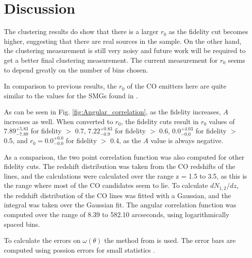 \section{Discussion}

The clustering results do show that there is a larger $r_0$ as the fidelity cut becomes higher, suggesting that there are real sources in the sample. On the other hand, the clustering measurement is still very noisy and future work will be required to get a better final clustering measurement. The current measurement for $r_0$ seems to depend greatly on the number of bins chosen. 

In comparison to previous results, the $r_0$ of the CO emitters here are quite similar to the values for the SMGs found in \cite{10.1111/j.1365-2966.2011.20303.x}.

As can be seen in Fig. \ref{fig:Angular_correlation}, as the fidelity increases, $A$ increases as well. When converted to $r_0$, the fidelity cuts result in $r_0$ values of $7.89_{-7.89}^{+5.83}$ for fidelity $>$ 0.7, $7.22_{-0.9}^{+0.83}$ for fidelity $>$ 0.6, $0.0_{-0.0}^{+4.03}$ for fidelity $>$ 0.5, and $r_0 = 0.0_{-0.0}^{+0.0}$ for fidelity $>$ 0.4, as the $A$ value is always negative.

As a comparison, the two point correlation function was also computed for other fidelity cuts. The redshift distribution was taken from the CO redshifts of the lines, and the calculations were calculated over the range z = 1.5 to 3.5, as this is the range where most of the CO candidates seem to lie. To calculate $dN_{1,2}/dz$, the redshift distribution of the CO lines was fitted with a Gaussian, and the integral was taken over the Gaussian fit. The angular correlation function was computed over the range of 8.39 to 582.10 arcseconds, using logarithmically spaced bins. 

To calculate the errors on $\omega(\theta)$ the method from \cite{1986ApJ...303..336G} is used. The error bars are computed using possion errors for small statistics \cite{1986ApJ...303..336G}.


